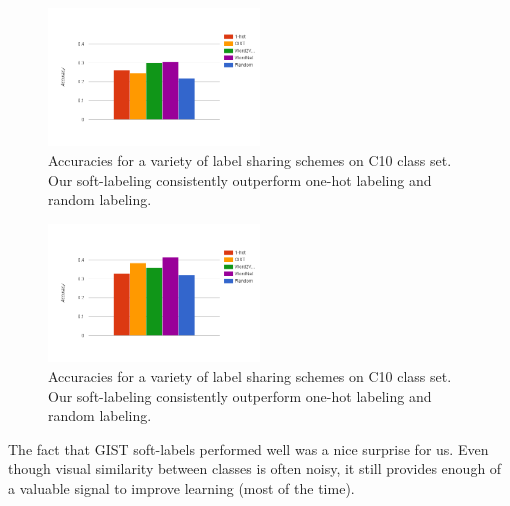 \begin{figure}[!tb]
  \centering
  \includegraphics[width=0.5\textwidth]{figs/10_1-train_100.png}
  \caption{
      Accuracies for a variety of label sharing schemes on C10 class set. Our
      soft-labeling consistently outperform one-hot labeling and random
      labeling.
  }
  \label{fig:10_1-train_100}
\end{figure}

\begin{figure}[!tb]
  \centering
  \includegraphics[width=0.5\textwidth]{figs/10_1-train_1260.png}
  \caption{
      Accuracies for a variety of label sharing schemes on C10 class set. Our
      soft-labeling consistently outperform one-hot labeling and random
      labeling.
  }
  \label{fig:10_1-train_1260}
\end{figure}

The fact that GIST soft-labels performed well was a nice surprise for us. Even
though visual similarity between classes is often noisy, it still provides
enough of a valuable signal to improve learning (most of the time).


